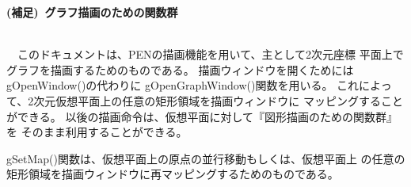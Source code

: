 \documentclass[11pt,a4j]{jarticle}
\newenvironment{itemize2}%
{%
   \begin{list}{$\bullet$\ \ }%
   {%
      \setlength{\itemindent}{0pt}
      \setlength{\leftmargin}{3zw}%
      \setlength{\rightmargin}{0zw}%
      \setlength{\labelsep}{0zw}%
      \setlength{\labelwidth}{3zw}%
      \setlength{\itemsep}{0em}%
      \setlength{\parsep}{0em}%
      \setlength{\listparindent}{0zw}%
   }
}{%
   \end{list}%
}
\newcommand{\ExerciseTitle}[1]{%
  \begin{center}\Large
    \textbf{PEN マニュアル Q \& A} \qquad \texttt{#1}
  \end{center}%
}
\begin{document}
\begin{center}
\begin{LARGE}
{\bf{(補足)~グラフ描画のための関数群\\
\ \\}}
\end{LARGE}
\end{center}

　このドキュメントは、PENの描画機能を用いて、主として2次元座標
平面上でグラフを描画するためのものである。
描画ウィンドウを開くためにはgOpenWindow()の代わりに
gOpenGraphWindow()関数を用いる。
これによって、2次元仮想平面上の任意の矩形領域を描画ウィンドウに
マッピングすることができる。
以後の描画命令は、仮想平面に対して『図形描画のための関数群』を
そのまま利用することができる。

gSetMap()関数は、仮想平面上の原点の並行移動もしくは、仮想平面上
の任意の矩形領域を描画ウィンドウに再マッピングするためのものである。

%
%
\end{document}
